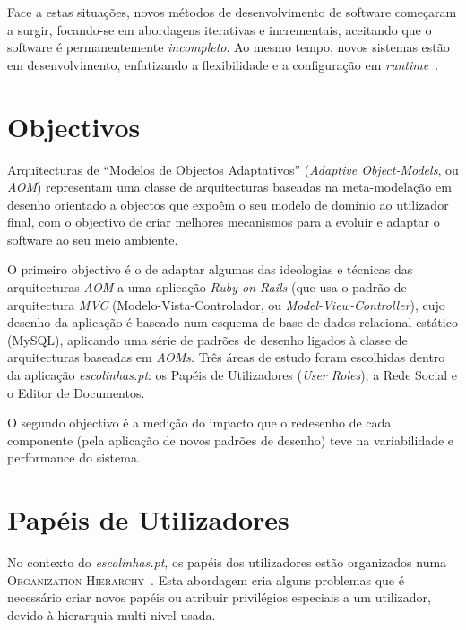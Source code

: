 \documentclass[9pt,a4paper]{extarticle}
\begin{document}
\begin{multicols}{2}

Face a estas situações, novos métodos de desenvolvimento de software começaram a surgir, focando-se em abordagens iterativas e incrementais, aceitando que o software é permanentemente \emph{incompleto}. Ao mesmo tempo, novos sistemas estão em desenvolvimento, enfatizando a flexibilidade e a configuração em \emph{runtime}~\cite{YJ02}.

\section{Objectivos}\label{sec:objectives}

Arquitecturas de ``Modelos de Objectos Adaptativos'' (\emph{Adaptive Object-Models}, ou \emph{AOM}) representam uma classe de arquitecturas baseadas na meta-modelação em desenho orientado a objectos que expoêm o seu modelo de domínio ao utilizador final, com o objectivo de criar melhores mecanismos para a evoluir e adaptar o software ao seu meio ambiente.

O primeiro objectivo é o de adaptar algumas das ideologias e técnicas das arquitecturas \emph{AOM} a uma aplicação \emph{Ruby on Rails} (que usa o padrão de arquitectura \emph{MVC} (Modelo-Vista-Controlador, ou \emph{Model-View-Controller}), cujo desenho da aplicação é baseado num esquema de base de dados relacional estático (MySQL), aplicando uma série de padrões de desenho ligados à classe de arquitecturas baseadas em \emph{AOMs}. Três áreas de estudo foram escolhidas dentro da aplicação \emph{escolinhas.pt}: os Papéis de Utilizadores (\emph{User Roles}), a Rede Social e o Editor de Documentos.

O segundo objectivo é a medição do impacto que o redesenho de cada componente (pela aplicação de novos padrões de desenho) teve na variabilidade e performance do sistema.

\section{Papéis de Utilizadores}\label{sec:user_roles}

No contexto do \emph{escolinhas.pt}, os papéis dos utilizadores estão organizados numa \textsc{Organization Hierarchy}~\cite{fowler_accountability}. Esta abordagem cria alguns problemas que é necessário criar novos papéis ou atribuir privilégios especiais a um utilizador, devido à hierarquia multi-nivel usada.


\end{multicols}
\end{document}
